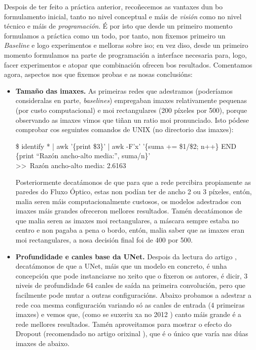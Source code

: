 \documentclass{article}
\begin{document}
Despois de ter feito a práctica anterior, recoñecemos as vantaxes dun bo formulamento inicial, tanto no nivel conceptual e máis de \emph{visión} como no nivel técnico e máis de \emph{programación}. É por isto que desde un primeiro momento formulamos a práctica como un todo, por tanto, non fixemos primeiro un \emph{Baseline} e logo experimentos e melloras sobre iso; en vez diso, desde un primeiro momento formulamos na parte de programación a interface necesaria para, logo, facer experimentos e atopar que combinación ofrecen bos resultados. Comentamos agora, aspectos nos que fixemos probas e as nosas conclusións:

\begin{itemize}
	\item \textbf{Tamaño das imaxes.} As primeiras redes que adestramos (poderíamos consideralas en parte, \emph{baselines}) empregaban imaxes relativamente pequenas (por custo computacional) e moi rectangulares (200 píxeles por 500), porque observando as imaxes vimos que tiñan un ratio moi pronunciado. Isto pódese comprobar cos seguintes comandos de UNIX (no directorio das imaxes):


\begin{tcolorbox}[colback=gray!10!white, colframe=gray!50!black, 
  boxrule=0.5pt, arc=2pt, left=4pt, right=4pt, top=2pt, bottom=2pt,
  fontupper=\ttfamily\small]
\$ identify * | awk '\{print \$3\}' | awk -F'x' '\{suma += \$1/\$2; n++\} END \{print ``Razón ancho-alto media:'', suma/n\}' \\
\string>>\ Razón ancho-alto media: 2.6163
\end{tcolorbox}

Posteriormente decatámonos de que para que a rede percibira propiamente as paredes do Fluxo Óptico, estas non podían ter de ancho 2 ou 3 píxeles, entón, malia seren máis computacionalmente custosos, os modelos adestrados con imaxes máis grandes ofreceron mellores resultados. Tamén decatámonos de que malia seren as imaxes moi rectangulares, a máscara sempre estaba no centro e non pagaba a pena o bordo, entón, malia saber que as imaxes eran moi rectangulares, a nosa decisión final foi de 400 por 500. 

\item \textbf{Profundidade e canles base da UNet.} Despois da lectura do artigo \cite{ronneberger2015u}, decatámonos de que a UNet, máis que un modelo en concreto, é unha concepción que pode instanciarse no xeito que o fixeron os autores, é dicir, 3 niveis de profundidade 64 canles de saída na primeira convolución, pero que facilmente pode mutar a outras configuracións. Abaixo probamos a adestrar a rede coa mesma configuración variando só as canles de entrada (4 primeiras imaxes) e vemos que, (como se suxeriu xa no 2012 \cite{imagenet}) canto máis grande é a rede mellores resultados. Tamén aproveitamos para mostrar o efecto do Dropout \cite{srivastava2014dropout} (recomendado no artigo orixinal \cite{ronneberger2015u}), que é o único que varía nas dúas imaxes de abaixo. 


\end{itemize}
\end{document}

